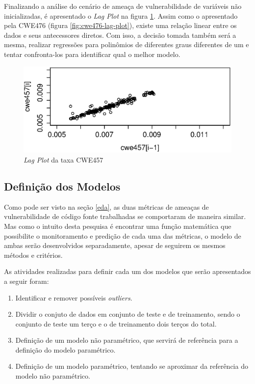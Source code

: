 Finalizando a análise do cenário de ameaça de vulnerabilidade de variáveis não
inicializadas, é apresentado o \textit{Lag Plot} na figura
\ref{fig:cwe457-lag-plot}. Assim como o apresentado pela CWE476 (figura
\ref{fig:cwe476-lag-plot}), existe uma relação linear entre os dados e seus
antecessores diretos. Com isso, a decisão tomada também será a mesma, realizar
regressões para polinômios de diferentes graus diferentes de um e tentar
confronta-los para identificar qual o melhor modelo.

\begin{figure}[h]
  \centering
  \includegraphics[width=1.0\textwidth]
      {figuras/cwe457-lag-plot.eps}
      \caption{\textit{Lag Plot} da taxa CWE457}
  \label{fig:cwe457-lag-plot}
\end{figure}



\subsection{Definição dos Modelos}\label{definicaomodelos}

Como pode ser visto na seção \ref{eda}, as duas métricas de ameaças de
vulnerabilidade de código fonte trabalhadas se comportaram de maneira similar.
Mas como o intuito desta pesquisa é encontrar uma função matemática que
possibilite o monitoramento e predição de cada uma das métricas, o modelo de
ambas serão desenvolvidos separadamente, apesar de seguirem os mesmos métodos e
critérios.

As atividades realizadas para definir cada um dos modelos que serão apresentados a
seguir foram:

\begin{enumerate}
 \item Identificar e remover possíveis \textit{outliers}.
 \item Dividir o conjuto de dados em conjunto de teste e de treinamento, sendo o
  conjunto de teste um terço e o de treinamento dois terços do total.
 \item Definição de um modelo não paramétrico, que servirá de referência para a
  definição do modelo paramétrico.
 \item Definição de um modelo paramétrico, tentando se aproximar da referência
  do modelo não paramétrico.
\end{enumerate}

